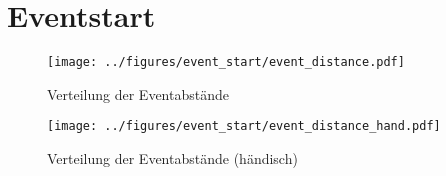 \chapter{Eventstart}
\label{chap:eventstart}


\begin{figure}[htbp]
    \centering
    \begin{minipage}[t]{0.47\textwidth}
      \centering
      \texttt{[image: ../figures/event\_start/event\_distance.pdf]}
      \caption{Verteilung der Eventabstände}
      \label{fig:histogram-eventdistance}
    \end{minipage}
 \begin{minipage}[t]{0.47\textwidth}
      \centering
      \texttt{[image: ../figures/event\_start/event\_distance\_hand.pdf]}
      \caption{Verteilung der Eventabstände (händisch)}
      \label{fig:histogram-eventdistance-hand}
  \end{minipage}
\end{figure}

